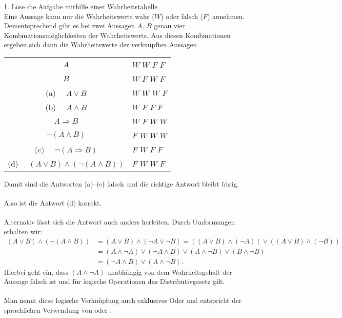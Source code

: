 \underline{1. Löse die Aufgabe mithilfe einer Wahrheitstabelle}\\
Eine Aussage kann nur die Wahrheitswerte wahr ($ W $) oder falsch ($ F $) annehmen.
Dementsprechend gibt es bei zwei Aussagen $ A $, $ B $ genau vier Kombinationsmöglichkeiten der Wahrheitswerte.
Aus diesen Kombinationen ergeben sich dann die Wahrheitswerte der verknüpften Aussagen.
\begin{center}
	\begin{tabular}{cllll}
		\hline
		\multicolumn{1}{c|}{$A$} & \multicolumn{4}{l}{$W$ $W$ $F$ $F$} \\
		\multicolumn{1}{c|}{$B$} & \multicolumn{4}{l}{$W$ $F$ $W$ $F$} \\ \hline
		\multicolumn{1}{c|}{(a) \ \ $ A \vee B$} & \multicolumn{4}{l}{$W$ $W$ $W$ $F$} \\ 
		\multicolumn{1}{c|}{(b) \ \ $ A \wedge B$} & \multicolumn{4}{l}{$W$ $F$ $F$ $F$} \\ 
		\multicolumn{1}{c|}{$ A \Rightarrow B$} & \multicolumn{4}{l}{$W$ $F$ $W$ $W$} \\ 
		\hline
		\multicolumn{1}{c|}{$\neg ( A \wedge B)$} & \multicolumn{4}{l}{$F$ $W$ $W$ $W$} \\ 
		\multicolumn{1}{c|}{(c) \ \ $\neg (A \Rightarrow B)$} & \multicolumn{4}{l}{$F$ $W$ $F$ $F$} \\ 
		\hline
		\multicolumn{1}{c|}{(d) \ \ $ (A \vee B) \wedge (\neg ( A \wedge B))$} & \multicolumn{4}{l}{$F$ $W$ $W$ $F$} \\
		\hline
	\end{tabular}
\end{center}
Damit sind die Antworten (a)--(c) falsch und die richtige Antwort bleibt übrig.\\
\\
Also ist die Antwort (d) korrekt.\\
\\
Alternativ lässt sich die Antwort auch anders herleiten. Durch Umformungen erhalten wir:
\begin{align*}
	(A\vee B) \wedge (\neg (A\wedge B))
	&=
	(A\vee B) \wedge (\neg A \vee  \neg B)
	=
	((A\vee B) \wedge (\neg A)) \vee ( (A\vee B) \wedge  (\neg B))\\
	&=(A \wedge \neg A) \vee (\neg A \wedge B) \vee (A \wedge \neg B) \vee (B \wedge \neg B)\\
	&=
	(\neg A \wedge B) \vee (A \wedge \neg B).
\end{align*}
Hierbei geht ein, dass $ (A \wedge \neg A)  $ unabhängig von dem Wahrheitsgehalt der Aussage falsch ist und für logische Operationen das Distributivgesetz gilt.\\
\\
Man nennt diese logische Verknüpfung auch exklusives Oder und entspricht der sprachlichen Verwendung von \grqq oder \grqq.

